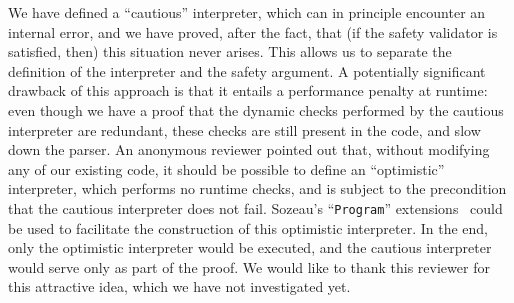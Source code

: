 \documentclass{llncs}
\begin{document}

We have defined a ``cautious'' interpreter, which can in principle encounter
an internal error, and we have proved, after the fact, that (if the safety
validator is satisfied, then) this situation never arises. This allows us to
separate the definition of the interpreter and the safety argument. A
potentially significant drawback of this approach is that it entails a
performance penalty at runtime: even though we have a proof that the dynamic
checks performed by the cautious interpreter are redundant, these checks are
still present in the code, and slow down the parser. An anonymous reviewer
pointed out that, without modifying any of our existing code, it should be
possible to define an ``optimistic'' interpreter, which performs no runtime
checks, and is subject to the precondition that the cautious interpreter does
not fail. Sozeau's ``\verb+Program+'' extensions~\citeyear{sozeau-finger-07}
could be used to facilitate the construction of this optimistic
interpreter. In the end, only the optimistic interpreter would be executed,
and the cautious interpreter would serve only as part of the proof.
We would like to thank this reviewer for this attractive idea, which we have
not investigated yet.



\end{document}
